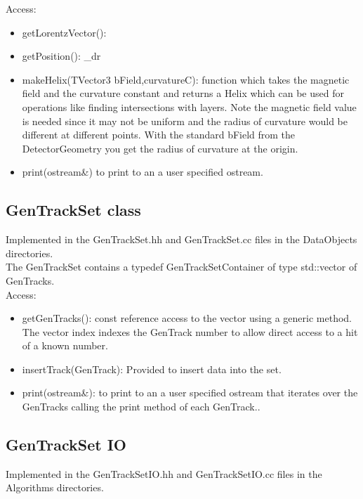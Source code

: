 \documentclass[aps,prd,superscriptaddress,floatfix]{revtex4}
\begin{document}
Access:
\begin{itemize}
\item getLorentzVector():
\item getPosition(): \_dr

\item makeHelix(TVector3 bField,curvatureC): function which takes the magnetic field and the curvature constant and returns
a Helix which can be used for operations like finding intersections with layers.  Note the magnetic field
value is needed since it may not be uniform and the radius of curvature would be different at different points.
With the standard bField from the DetectorGeometry you get the radius of curvature at the origin.

\item print(ostream\&) to print to an a user specified ostream.
\end{itemize}


\subsection{GenTrackSet class}
Implemented in the GenTrackSet.hh and GenTrackSet.cc files in the DataObjects directories.
\\

The GenTrackSet contains a typedef GenTrackSetContainer of type std::vector of GenTracks.
\\
Access:

\begin{itemize}
\item getGenTracks(): const reference access to the vector using a generic method.
The vector index indexes the GenTrack number to allow direct access to a hit of a known number.

\item insertTrack(GenTrack): Provided to insert data into the set.

\item print(ostream\&): to print to an a user specified ostream that iterates over
the GenTracks calling the print method of each GenTrack..
\end{itemize}


\subsection{GenTrackSet IO}
Implemented in the GenTrackSetIO.hh and GenTrackSetIO.cc files in the Algorithms directories.
\\
\end{document}
